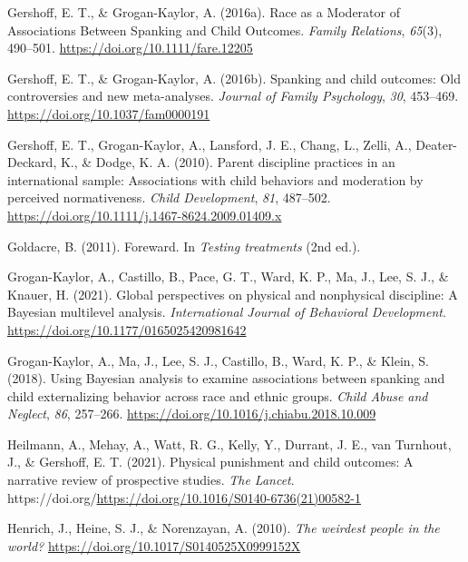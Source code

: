 \documentclass[
  letterpaper,
  DIV=11,
  numbers=noendperiod]{scrreprt}
\newlength{\cslhangindent}
\newlength{\cslentryspacingunit} %
\newenvironment{CSLReferences}[2] %
 {%
  \setlength{\parindent}{0pt}
  \ifodd #1
  \let\oldpar\par
  \def\par{\hangindent=\cslhangindent\oldpar}
  \fi
  \setlength{\parskip}{#2\cslentryspacingunit}
 }%
 {}
\begin{document}
\begin{CSLReferences}{1}{0}
\leavevmode{}%
Gershoff, E. T., \& Grogan-Kaylor, A. (2016a). {Race as a Moderator of
Associations Between Spanking and Child Outcomes}. \emph{Family
Relations}, \emph{65}(3), 490--501.
\url{https://doi.org/10.1111/fare.12205}

\leavevmode{}%
Gershoff, E. T., \& Grogan-Kaylor, A. (2016b). Spanking and child
outcomes: Old controversies and new meta-analyses. \emph{Journal of
Family Psychology}, \emph{30}, 453--469.
\url{https://doi.org/10.1037/fam0000191}

\leavevmode{}%
Gershoff, E. T., Grogan-Kaylor, A., Lansford, J. E., Chang, L., Zelli,
A., Deater-Deckard, K., \& Dodge, K. A. (2010). Parent discipline
practices in an international sample: Associations with child behaviors
and moderation by perceived normativeness. \emph{Child Development},
\emph{81}, 487--502.
\url{https://doi.org/10.1111/j.1467-8624.2009.01409.x}

\leavevmode{}%
Goldacre, B. (2011). {Foreward}. In \emph{Testing treatments} (2nd ed.).

\leavevmode{}%
Grogan-Kaylor, A., Castillo, B., Pace, G. T., Ward, K. P., Ma, J., Lee,
S. J., \& Knauer, H. (2021). {Global perspectives on physical and
nonphysical discipline: A {B}ayesian multilevel analysis}.
\emph{International Journal of Behavioral Development}.
\url{https://doi.org/10.1177/0165025420981642}

\leavevmode{}%
Grogan-Kaylor, A., Ma, J., Lee, S. J., Castillo, B., Ward, K. P., \&
Klein, S. (2018). Using {B}ayesian analysis to examine associations
between spanking and child externalizing behavior across race and ethnic
groups. \emph{Child Abuse and Neglect}, \emph{86}, 257--266.
\url{https://doi.org/10.1016/j.chiabu.2018.10.009}

\leavevmode{}%
Heilmann, A., Mehay, A., Watt, R. G., Kelly, Y., Durrant, J. E., van
Turnhout, J., \& Gershoff, E. T. (2021). Physical punishment and child
outcomes: A narrative review of prospective studies. \emph{The Lancet}.
https://doi.org/\url{https://doi.org/10.1016/S0140-6736(21)00582-1}

\leavevmode{}%
Henrich, J., Heine, S. J., \& Norenzayan, A. (2010). \emph{{The weirdest
people in the world?}} \url{https://doi.org/10.1017/S0140525X0999152X}


\end{CSLReferences}
\end{document}
